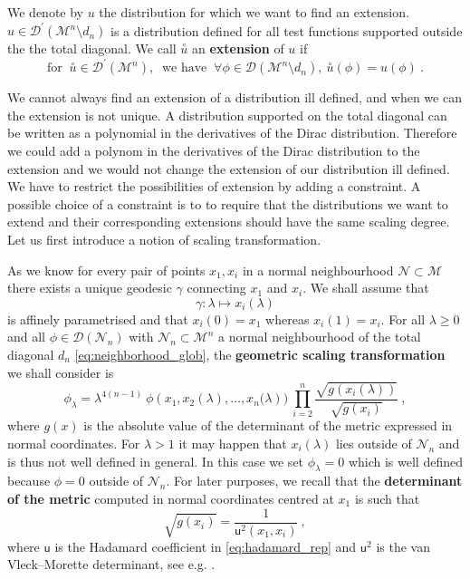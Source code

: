 \documentclass[11pt]{book}
\newcommand{\exte}[1]{\overset{\circ}{#1}}
\newcommand{\Dcal}{\mathcal{D}}
\newcommand{\Mcal}{\mathcal{M}}
\newcommand{\Ncal}{\mathcal{N}}
\newcommand{\usf}{\mathsf{u}}
\theoremstyle{break}
\begin{document}
We denote by $u$ the distribution for which we want to find an extension. $u \in \Dcal^\prime(\Mcal^n \setminus d_n )$ is a distribution defined for all test functions supported outside the the total diagonal. We call $\exte{u}$ an \textbf{extension} of $u$ if 
%
\begin{equation*}
\mbox{for } \ \exte{u} \in \Dcal^\prime(\Mcal^n), \ \mbox{ we have } \ \forall \phi \in \Dcal\left(\Mcal^n \setminus d_n \right), \ \exte{u}(\phi) = u(\phi) \ .
\end{equation*}


We cannot always find an extension of a distribution ill defined, and when we can the extension is not unique. A distribution supported on the total diagonal can be written as a polynomial in the derivatives of the Dirac distribution. Therefore we could add a polynom in the derivatives of the Dirac distribution to the extension and we would not change the extension of our distribution ill defined. We have to restrict the possibilities of extension by adding a constraint. A possible choice of a constraint is to to require that the distributions we want to extend and their corresponding extensions should have the same scaling degree. Let us first introduce a notion of scaling transformation.


As we know for every pair of points $x_1,x_i$ in a normal neighbourhood $\Ncal \subset \Mcal$ there exists a unique geodesic $\gamma$ connecting $x_1$ and $x_i$. We shall assume that
%
\begin{equation*}
\gamma : \lambda \mapsto x_i(\lambda) 
\end{equation*}
%
is affinely parametrised and that $x_i(0) =x_1$ whereas $x_i(1) = x_i$. For all $\lambda \geq 0$ and all $\phi \in \Dcal(\Ncal_n)$ with $\Ncal_n \subset \Mcal^n$ a normal neighbourhood of the total diagonal $d_n$ \eqref{eq:neighborhood_glob}, the \textbf{geometric scaling transformation} we shall consider is
%
\begin{equation}
\phi_\lambda = \lambda^{4(n-1)} \ \phi\left(x_1,x_2(\lambda ),\dots,x_n(\lambda\right)) \ \prod_{i=2}^n \frac{\sqrt{g(x_i(\lambda ))}}{\sqrt{g(x_i)}} \ ,
\label{eq:geo_scaling_transfo}
\end{equation}
%
where $g(x)$ is the absolute value of the determinant of the metric expressed in normal coordinates. For $\lambda > 1$ it may happen that $x_i(\lambda)$ lies outside of $\Ncal_n$ and is thus not well defined in general. In this case we set $\phi_\lambda = 0$ which is well defined because $\phi = 0$ outside of $\Ncal_n$. For later purposes, we recall that the \textbf{determinant of the metric} computed in normal coordinates centred at $x_1$ is such that
%
\begin{equation*}
\sqrt{g(x_i)} = \frac{1}{\usf^2(x_1,x_i)} \ , 
\end{equation*}
%
where $\usf$ is the Hadamard coefficient in \eqref{eq:hadamard_rep} and $\usf^2$ is the van Vleck--Morette determinant, see e.g. \cite{poisson_motion_2011}.
\end{document}
